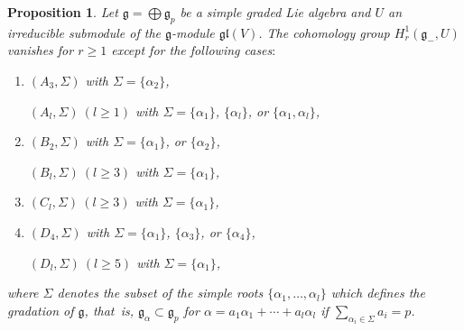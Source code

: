 \documentclass[pdftex]{sigma}%
\newcommand{\g}{\mathfrak g}
\newcommand{\gl}{\mathfrak{gl}}
\newcommand{\V}{V}
\newtheorem{prop}[thm]{Proposition}
\numberwithin{equation}{section}
\begin{document}
\begin{prop}\label{thm3} Let $\g = \bigoplus \g_p $ be a simple graded Lie algebra and $U$ an irreducible submodule of the $\g$-module $\gl(\V)$. The cohomology group $H^1_r(\g_-, U)$ vanishes for $r \ge 1$ except for the following cases$:$
\begin{enumerate}\itemsep=0pt
\item[$1.$] $(A_3,\Sigma)$ with $\Sigma=\{\alpha_2\}$,

$(A_l, \Sigma) \ (l\ge 1 )$ with $\Sigma = \{\alpha_1\}$, $\{\alpha_l\}$, or $\{\alpha_1, \alpha_l\}$,

\item[$2.$] $(B_2, \Sigma)$ with $\Sigma = \{\alpha_1\}$, or $\{\alpha_2 \}$,

$(B_l, \Sigma) \ (l\ge 3 )$ with $\Sigma = \{\alpha_1\}$,

\item[$3.$] $(C_l, \Sigma) \ (l\ge 3 )$ with $\Sigma = \{\alpha_1\}$,


\item[$4.$] $(D_4, \Sigma) $ with $\Sigma = \{\alpha_1\}$, $\{\alpha_3 \}$, or $\{\alpha_4 \}$,

$(D_l, \Sigma) \ (l\ge 5 )$ with $\Sigma = \{\alpha_1\}$,
\end{enumerate}
	where $\Sigma$ denotes the subset of the simple roots $\{\alpha_1, \dots, \alpha_l\}$
	which defines the gradation of $\g$, that~is, $\g_{\alpha} \subset \g_p$ for
	$\alpha = a_1\alpha_1 + \cdots + a_l\alpha_l$
	if
	$ \sum	_{\alpha_i \in \Sigma} a_i	= p	$.
\end{prop}
\end{document}
